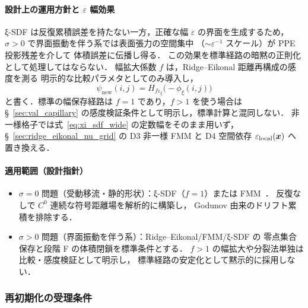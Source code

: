 \paragraph*{設計上の運用方針と $\varepsilon$ 幅効果}
ξ-SDF は反復累積誤差を持たない一方，正確な幅 $\varepsilon$ の界面を生成するため，
$\sigma>0$ で界面振動を伴う系では表面張力の空間集中
（$\sim\varepsilon^{-1}$ スケール）が PPE 投影残差を介して
体積誤差に伝播し得る．
この効果を標準経路の暗黙の正則化として処理してはならない．
幅拡大係数 $f$ は，Ridge--Eikonal 距離再構成の感度を測る
明示的な比較パラメタとしてのみ導入し，
\begin{equation}
  \psi_{\mathrm{new}}(i,j) = H_{f\varepsilon_\xi}\!\bigl(-\phi_\xi(i,j)\bigr)
  \label{eq:xi_sdf_wide}
\end{equation}
と書く．標準の幅保存経路は $f{=}1$ であり，$f>1$ を使う場合は
§~\ref{sec:val_capillary} の感度検証条件として明示し，標準計算と混同しない．
非一様格子では式~\eqref{eq:xi_sdf_wide} の定数幅をそのまま用いず，
§~\ref{sec:ridge_eikonal_nu_grid} の D3 非一様 FMM と
D4 空間依存 $\varepsilon_\text{local}(\bm{x})$ へ置き換える．

\paragraph*{適用範囲（設計指針）}
\begin{itemize}
  \item $\sigma=0$ 問題（受動移流・静的形状）：ξ-SDF（$f{=}1$）または FMM~\cite{Sethian1996}．
        反復なしで $C^0$ 連続な符号距離場を解析的に構築し，
        Godunov 由来のドリフト累積を排除する．
  \item $\sigma>0$ 問題（界面振動を伴う系）：Ridge--Eikonal/FMM/ξ-SDF の
        零点集合保存と段階 F の体積閉鎖を標準条件とする．
        $f>1$ の幅拡大や分裂法単独は比較・感度検証として明示し，
        標準経路の安定化として黙示的に採用しない．
\end{itemize}

\subsubsection{再初期化の受理条件}

